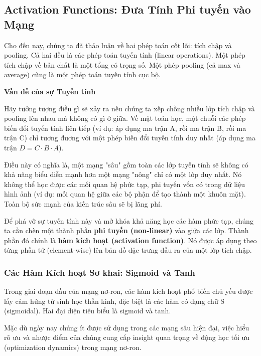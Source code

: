 \subsection{Activation Functions: Đưa Tính Phi tuyến vào Mạng}
\label{subsec:activation_functions}

Cho đến nay, chúng ta đã thảo luận về hai phép toán cốt lõi: tích chập và pooling. Cả hai đều là các phép toán tuyến tính (linear operations). Một phép tích chập về bản chất là một tổng có trọng số. Một phép pooling (cả max và average) cũng là một phép toán tuyến tính cục bộ.

\begin{mdframed}[style=infobox]
	\textbf{Vấn đề của sự Tuyến tính}
	
	Hãy tưởng tượng điều gì sẽ xảy ra nếu chúng ta xếp chồng nhiều lớp tích chập và pooling lên nhau mà không có gì ở giữa. Về mặt toán học, một chuỗi các phép biến đổi tuyến tính liên tiếp (ví dụ: áp dụng ma trận A, rồi ma trận B, rồi ma trận C) chỉ tương đương với một phép biến đổi tuyến tính duy nhất (áp dụng ma trận $D = C \cdot B \cdot A$).
	
	Điều này có nghĩa là, một mạng "sâu" gồm toàn các lớp tuyến tính sẽ không có khả năng biểu diễn mạnh hơn một mạng "nông" chỉ có một lớp duy nhất. Nó không thể học được các mối quan hệ phức tạp, phi tuyến vốn có trong dữ liệu hình ảnh (ví dụ: mối quan hệ giữa các bộ phận để tạo thành một khuôn mặt). Toàn bộ sức mạnh của kiến trúc sâu sẽ bị lãng phí.
\end{mdframed}

Để phá vỡ sự tuyến tính này và mở khóa khả năng học các hàm phức tạp, chúng ta cần chèn một thành phần \textbf{phi tuyến (non-linear)} vào giữa các lớp. Thành phần đó chính là \textbf{hàm kích hoạt (activation function)}. Nó được áp dụng theo từng phần tử (element-wise) lên bản đồ đặc trưng đầu ra của một lớp tích chập.

\subsubsection{Các Hàm Kích hoạt Sơ khai: Sigmoid và Tanh}
\label{subsubsec:early_activations}

Trong giai đoạn đầu của mạng nơ-ron, các hàm kích hoạt phổ biến chủ yếu được lấy cảm hứng từ sinh học thần kinh, đặc biệt là các hàm có dạng chữ S (sigmoidal). Hai đại diện tiêu biểu là sigmoid và tanh.

Mặc dù ngày nay chúng ít được sử dụng trong các mạng sâu hiện đại, việc hiểu rõ ưu và nhược điểm của chúng cung cấp insight quan trọng về động học tối ưu (optimization dynamics) trong mạng nơ-ron.

